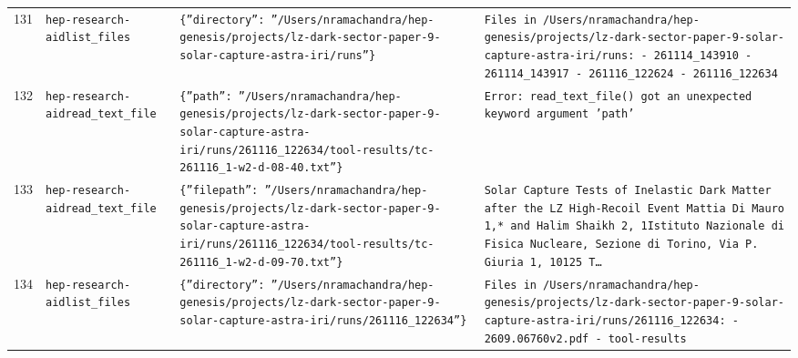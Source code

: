 \documentclass[11pt,a4paper]{article}
\begin{document}
\begin{longtable}{@{}p{}p{}p{}p{}@{}}
131 & \texttt{hep-research-aid}\newline\texttt{list\_\allowbreak{}files} & \texttt{\{''directory'':\allowbreak{} ''/\allowbreak{}Users/\allowbreak{}nramachandra/\allowbreak{}hep-genesis/\allowbreak{}projects/\allowbreak{}lz-dark-sector-paper-9-solar-capture-astra-iri/\allowbreak{}runs''\}\allowbreak{}} & \texttt{Files in /\allowbreak{}Users/\allowbreak{}nramachandra/\allowbreak{}hep-genesis/\allowbreak{}projects/\allowbreak{}lz-dark-sector-paper-9-solar-capture-astra-iri/\allowbreak{}runs:\allowbreak{}   - 261114\_\allowbreak{}143910   - 261114\_\allowbreak{}143917   - 261116\_\allowbreak{}122624   - 261116\_\allowbreak{}122634} \\
132 & \texttt{hep-research-aid}\newline\texttt{read\_\allowbreak{}text\_\allowbreak{}file} & \texttt{\{''path'':\allowbreak{} ''/\allowbreak{}Users/\allowbreak{}nramachandra/\allowbreak{}hep-genesis/\allowbreak{}projects/\allowbreak{}lz-dark-sector-paper-9-solar-capture-astra-iri/\allowbreak{}runs/\allowbreak{}261116\_\allowbreak{}122634/\allowbreak{}tool-results/\allowbreak{}tc-261116\_\allowbreak{}1-w2-d-08-40.txt''\}\allowbreak{}} & \texttt{Error:\allowbreak{} read\_\allowbreak{}text\_\allowbreak{}file()\allowbreak{} got an unexpected keyword argument 'path'} \\
133 & \texttt{hep-research-aid}\newline\texttt{read\_\allowbreak{}text\_\allowbreak{}file} & \texttt{\{''filepath'':\allowbreak{} ''/\allowbreak{}Users/\allowbreak{}nramachandra/\allowbreak{}hep-genesis/\allowbreak{}projects/\allowbreak{}lz-dark-sector-paper-9-solar-capture-astra-iri/\allowbreak{}runs/\allowbreak{}261116\_\allowbreak{}122634/\allowbreak{}tool-results/\allowbreak{}tc-261116\_\allowbreak{}1-w2-d-09-70.txt''\}\allowbreak{}} & \texttt{Solar Capture Tests of Inelastic Dark Matter after the LZ High-Recoil Event Mattia Di Mauro 1,\allowbreak{}* and Halim Shaikh 2,\allowbreak{}\dag{}\allowbreak{} 1Istituto Nazionale di Fisica Nucleare,\allowbreak{} Sezione di Torino,\allowbreak{} Via P. Giuria 1,\allowbreak{} 10125 T\ldots{}\allowbreak{}} \\
134 & \texttt{hep-research-aid}\newline\texttt{list\_\allowbreak{}files} & \texttt{\{''directory'':\allowbreak{} ''/\allowbreak{}Users/\allowbreak{}nramachandra/\allowbreak{}hep-genesis/\allowbreak{}projects/\allowbreak{}lz-dark-sector-paper-9-solar-capture-astra-iri/\allowbreak{}runs/\allowbreak{}261116\_\allowbreak{}122634''\}\allowbreak{}} & \texttt{Files in /\allowbreak{}Users/\allowbreak{}nramachandra/\allowbreak{}hep-genesis/\allowbreak{}projects/\allowbreak{}lz-dark-sector-paper-9-solar-capture-astra-iri/\allowbreak{}runs/\allowbreak{}261116\_\allowbreak{}122634:\allowbreak{}   - 2609.06760v2.pdf   - tool-results} \\

\end{longtable}
\end{document}
